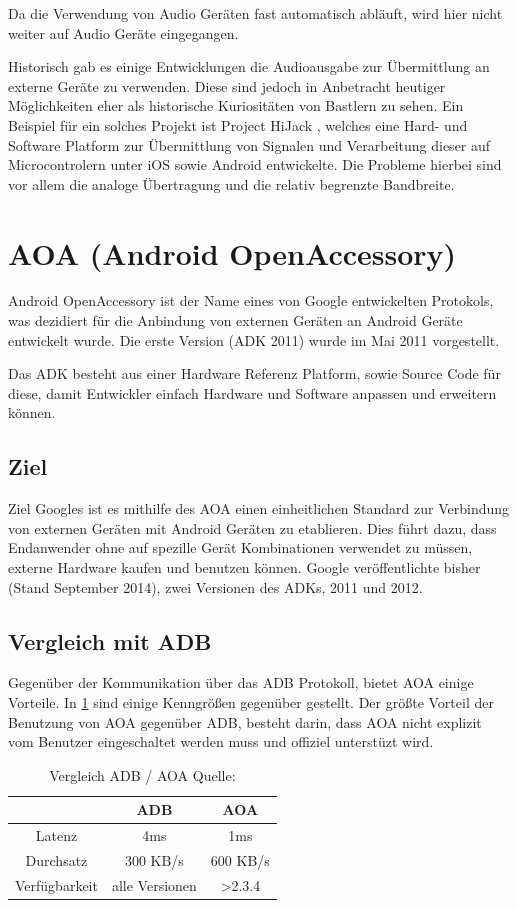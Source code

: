 \documentclass[12pt,journal,compsoc]{IEEEtran}
\begin{document}
Da die Verwendung von Audio Geräten fast automatisch abläuft, wird hier nicht weiter auf Audio Geräte eingegangen.

Historisch gab es einige Entwicklungen die Audioausgabe zur Übermittlung an externe Geräte zu verwenden. Diese sind jedoch in Anbetracht heutiger Möglichkeiten eher als historische Kuriositäten von Bastlern zu sehen.
Ein Beispiel für ein solches Projekt ist Project HiJack \cite{hijack} , welches eine Hard- und Software Platform zur Übermittlung von Signalen und Verarbeitung dieser auf Microcontrolern unter iOS sowie Android entwickelte.
Die Probleme hierbei sind vor allem die analoge Übertragung und die relativ begrenzte Bandbreite.


\section{AOA (Android OpenAccessory)}
Android OpenAccessory ist der Name eines von Google entwickelten Protokols, was 
dezidiert für die Anbindung von externen Geräten an Android Geräte entwickelt wurde.
Die erste Version (ADK 2011) wurde im Mai 2011 vorgestellt.

Das ADK besteht aus einer Hardware Referenz Platform, sowie Source Code für diese, damit 
Entwickler einfach Hardware und Software anpassen und erweitern können.
\cite{developaoa}
\subsection{Ziel}
Ziel Googles ist es mithilfe des AOA einen einheitlichen Standard zur Verbindung von externen Geräten mit Android Geräten zu etablieren.
Dies führt dazu, dass Endanwender ohne auf spezille Gerät Kombinationen verwendet zu müssen, externe Hardware kaufen und benutzen können.
Google veröffentlichte bisher (Stand September 2014), zwei Versionen des ADKs, 2011 und 2012. 

\subsection{Vergleich mit ADB}
Gegenüber der Kommunikation über das ADB Protokoll, bietet AOA einige Vorteile. In \ref{table:vergl} sind einige Kenngrößen gegenüber gestellt. Der größte Vorteil der Benutzung von AOA gegenüber ADB, besteht darin, dass AOA nicht explizit vom Benutzer eingeschaltet werden muss und offiziel unterstüzt wird.


\begin{table}
	\centering
	\caption{Vergleich ADB / AOA Quelle: \cite{comp}}
	\label{table:vergl}
	\begin{tabular}{c | c | c}
		& ADB & AOA \\ \hline
		Latenz & 4ms & 1ms \\ \hline
		Durchsatz & 300 KB/s & 600 KB/s \\ \hline
		Verfügbarkeit & alle Versionen & \textgreater 2.3.4 \\ \hline
	\end{tabular}
\end{table}
\end{document}

